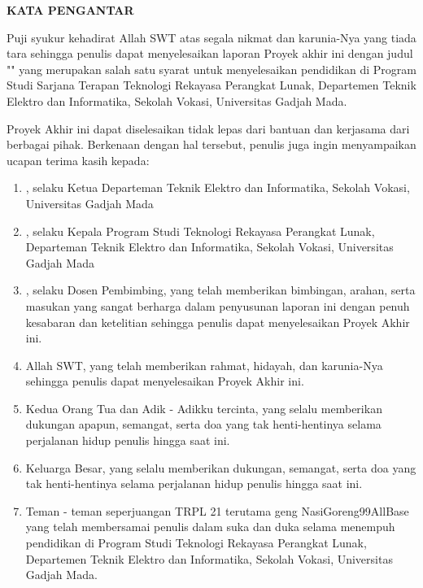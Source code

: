 \clearpage
{}
{}
\begin{center}
    \textbf{\large KATA PENGANTAR}\\[3em]
\end{center}

Puji syukur kehadirat Allah SWT atas segala nikmat dan karunia-Nya yang tiada tara sehingga penulis dapat menyelesaikan laporan Proyek akhir ini dengan judul "{\judulid}" yang merupakan salah satu syarat untuk menyelesaikan pendidikan di Program Studi Sarjana Terapan Teknologi Rekayasa Perangkat Lunak, Departemen Teknik Elektro dan Informatika, Sekolah Vokasi, Universitas Gadjah Mada.

Proyek Akhir ini dapat diselesaikan tidak lepas dari bantuan dan kerjasama dari berbagai pihak. Berkenaan dengan hal tersebut, penulis juga ingin menyampaikan ucapan terima kasih kepada:

\begin{enumerate}
    \item \koordepartemen, selaku Ketua Departeman Teknik Elektro dan Informatika, Sekolah Vokasi, Universitas Gadjah Mada
    \item {\koorprodi}, selaku Kepala Program Studi Teknologi Rekayasa Perangkat Lunak, Departeman Teknik Elektro dan Informatika, Sekolah Vokasi, Universitas Gadjah Mada
    \item {\pembimbing}, selaku Dosen Pembimbing, yang telah memberikan bimbingan, arahan, serta masukan yang sangat berharga dalam penyusunan laporan ini dengan penuh kesabaran dan ketelitian sehingga penulis dapat menyelesaikan Proyek Akhir ini.
    \item Allah SWT, yang telah memberikan rahmat, hidayah, dan karunia-Nya sehingga penulis dapat menyelesaikan Proyek Akhir ini.
    \item Kedua Orang Tua dan Adik - Adikku tercinta, yang selalu memberikan dukungan apapun, semangat, serta doa yang tak henti-hentinya selama perjalanan hidup penulis hingga saat ini.
    \item Keluarga Besar, yang selalu memberikan dukungan, semangat, serta doa yang tak henti-hentinya selama perjalanan hidup penulis hingga saat ini.
    \item Teman - teman seperjuangan TRPL 21 terutama geng NasiGoreng99AllBase yang telah membersamai penulis dalam suka dan duka selama menempuh pendidikan di Program Studi Teknologi Rekayasa Perangkat Lunak, Departemen Teknik Elektro dan Informatika, Sekolah Vokasi, Universitas Gadjah Mada.
\end{enumerate}

